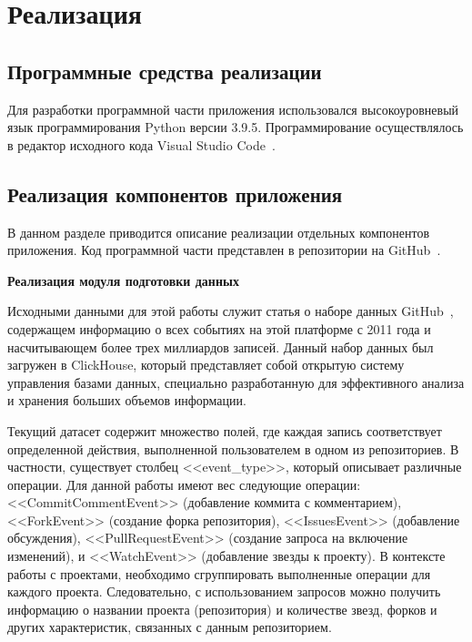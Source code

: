 \newpage
\section{Реализация}
\label{sec:Realization}

\subsection{Программные средства реализации}
Для разработки программной части приложения использовался высокоуровневый язык программирования Python версии 3.9.5. Программирование осуществлялось в редактор исходного кода Visual Studio Code~\cite{vscode}. 

\vspace{2em}
\subsection{Реализация компонентов приложения}
\label{subsec:Parser}
В данном разделе приводится описание реализации отдельных компонентов приложения. Код программной части представлен в репозитории на GitHub~\cite{github}.
\vspace{1em}

\textbf{Реализация модуля подготовки данных}

Исходными данными для этой работы служит статья о наборе данных GitHub~\cite{clickHouse}, содержащем информацию о всех событиях на этой платформе с 2011 года и насчитывающем более трех миллиардов записей. Данный набор данных был загружен в ClickHouse, который представляет собой открытую систему управления базами данных, специально разработанную для эффективного анализа и хранения больших объемов информации. 

Текущий датасет содержит множество полей, где каждая запись соответствует определенной действия, выполненной пользователем в одном из репозиториев. В частности, существует столбец <<event\_type>>, который описывает различные операции. Для данной работы имеют вес следующие операции: <<CommitCommentEvent>> (добавление коммита с комментарием), <<ForkEvent>> (создание форка репозитория), <<IssuesEvent>> (добавление обсуждения), <<PullRequestEvent>> (создание запроса на включение изменений), и <<WatchEvent>> (добавление звезды к проекту). В контексте работы с проектами, необходимо сгруппировать выполненные операции для каждого проекта. Следовательно, с использованием запросов можно получить информацию о названии проекта (репозитория) и количестве звезд, форков и других характеристик, связанных с данным репозиторием.

